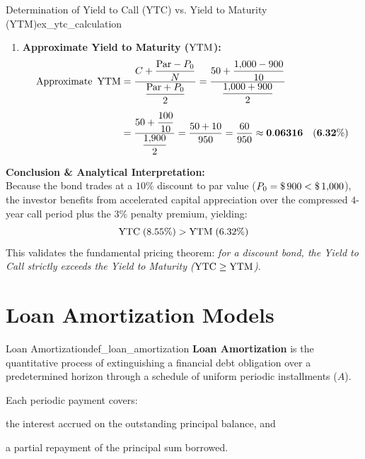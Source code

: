 \begin{example}{Determination of Yield to Call (YTC) vs. Yield to Maturity (YTM)}{ex_ytc_calculation}
\begin{enumerate}[leftmargin=*]
    \item \textbf{Approximate Yield to Maturity ($\operatorname{YTM}$):}
    \begin{align*}
        \text{Approximate } \operatorname{YTM} &= \frac{C + \dfrac{\text{Par} - P_0}{N}}{\dfrac{\text{Par} + P_0}{2}} = \frac{50 + \dfrac{1{,}000 - 900}{10}}{\dfrac{1{,}000 + 900}{2}} \\[0.5em]
        &= \frac{50 + \dfrac{100}{10}}{\dfrac{1{,}900}{2}} = \frac{50 + 10}{950} = \frac{60}{950} \approx \mathbf{0.06316} \quad (\mathbf{6.32\%})
    \end{align*}
\end{enumerate}

\textbf{Conclusion \& Analytical Interpretation:} \\
Because the bond trades at a $10\%$ discount to par value ($P_0 = \text{\$}\, 900 < \text{\$}\, 1{,}000$), the investor benefits from accelerated capital appreciation over the compressed $4$-year call period plus the $3\%$ penalty premium, yielding:
\begin{equation*}
    \operatorname{YTC} \; (8.55\%) > \operatorname{YTM} \; (6.32\%)
\end{equation*}
This validates the fundamental pricing theorem: \textit{for a discount bond, the Yield to Call strictly exceeds the Yield to Maturity ($\operatorname{YTC} \ge \operatorname{YTM}$)}.
\end{example}

\section{Loan Amortization Models}

\begin{definition}{Loan Amortization}{def_loan_amortization}
\textbf{Loan Amortization} is the quantitative process of extinguishing a financial debt obligation over a predetermined horizon through a schedule of uniform periodic installments ($A$).

Each periodic payment covers:
\begin{enumerate*}[label=(\roman*), itemjoin=\quad]
    \item the interest accrued on the outstanding principal balance, and
    \item a partial repayment of the principal sum borrowed.
\end{enumerate*}
\end{definition}

